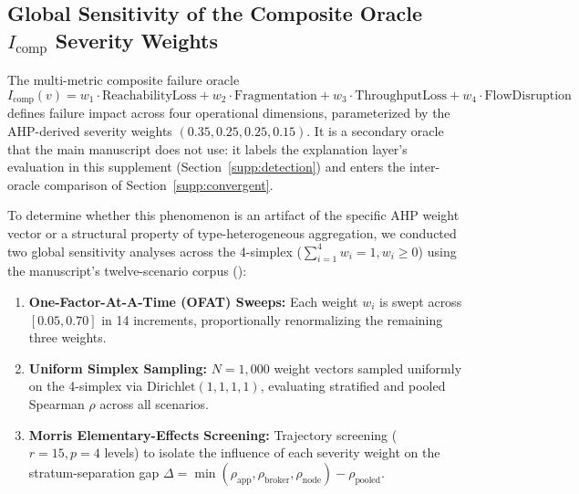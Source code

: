 \documentclass[preprint,3p]{elsarticle}
\begin{document}
\subsection{Global Sensitivity of the Composite Oracle \texorpdfstring{$I_{\text{comp}}$}{I\_comp} Severity Weights}
\label{supp:icomp}

The multi-metric composite failure oracle
\begin{equation}
I_{\text{comp}}(v) = w_1 \cdot \text{ReachabilityLoss} + w_2 \cdot \text{Fragmentation} + w_3 \cdot \text{ThroughputLoss} + w_4 \cdot \text{FlowDisruption}
\end{equation}
defines failure impact across four operational dimensions, parameterized by the AHP-derived severity weights $(0.35, 0.25, 0.25, 0.15)$. It is a secondary oracle that the main manuscript does not use: it labels the explanation layer's evaluation in this supplement (Section~\ref{supp:detection}) and enters the inter-oracle comparison of Section~\ref{supp:convergent}.

To determine whether this phenomenon is an artifact of the specific AHP weight vector or a structural property of type-heterogeneous aggregation, we conducted two global sensitivity analyses across the 4-simplex ($\sum_{i=1}^4 w_i = 1, w_i \ge 0$) using the manuscript's twelve-scenario corpus ():
\begin{enumerate}
    \item \textbf{One-Factor-At-A-Time (OFAT) Sweeps:} Each weight $w_i$ is swept across $[0.05, 0.70]$ in 14 increments, proportionally renormalizing the remaining three weights.
    \item \textbf{Uniform Simplex Sampling:} $N = 1{,}000$ weight vectors sampled uniformly on the 4-simplex via $\text{Dirichlet}(1, 1, 1, 1)$, evaluating stratified and pooled Spearman $\rho$ across all scenarios.
    \item \textbf{Morris Elementary-Effects Screening:} Trajectory screening ($r = 15, p = 4$ levels) to isolate the influence of each severity weight on the stratum-separation gap $\Delta = \min(\rho_{\text{app}}, \rho_{\text{broker}}, \rho_{\text{node}}) - \rho_{\text{pooled}}$.
\end{enumerate}
\end{document}
